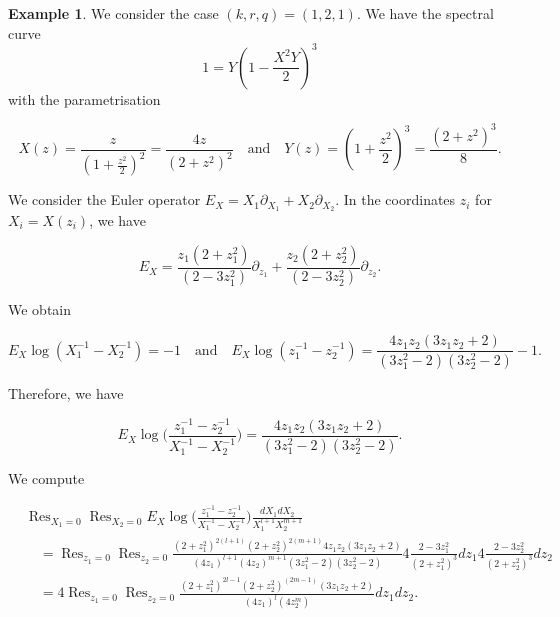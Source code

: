 \documentclass[10pt,a4paper,oneside,no-math,reqno]{amsart}%
\theoremstyle{plain}
\theoremstyle{definition}
\newtheorem{example}[theorem]{Example}
\theoremstyle{remark}
\numberwithin{equation}{section}
\newcommand{\1}{\mathds{1}}
\newcommand{\<}{\langle}
\renewcommand{\>}{\rangle}
\DeclareMathOperator*{\Res}{Res}
\begin{document}
\begin{example}
\label{ex-closedform}
We consider the case $(k,r,q)=(1,2,1)$. We have the spectral curve
\begin{equation}
    1
    =
    Y(1-\frac{X^2Y}{2})^3
\end{equation}
with the parametrisation

\begin{equation}
    X(z)
    =
    \frac{z}{(1+\frac{z^2}{2})^2}
    =
    \frac{4z}{(2+z^2)^2}
    \quad
    \textrm{and}
    \quad
    Y(z)
    =
    (1+\frac{z^2}{2})^3
    =
    \frac{(2+z^2)^3}{8}.
\end{equation}

We consider the Euler operator $ E_X = X_1 \partial_{X_1} + X_2 \partial_{X_2} $. In the coordinates $z_i$ for $X_i = X(z_i)$, we have

\begin{equation}
    E_X
    =
    \frac{z_1(2+z_1^2)}{(2-3z_1^2)} \partial_{z_1} + \frac{z_2(2+z_2^2)}{(2-3z_2^2)} \partial_{z_2}.
\end{equation}

We obtain

\begin{equation}
    E_X \log (X_1^{-1} - X_2^{-1})
    =
    -1
    \quad
    \textrm{and}
    \quad
    E_X \log (z_1^{-1} - z_2^{-1})
    =
    \frac{4z_1 z_2 (3z_1z_2 + 2)}{(3z_1^2 - 2) (3z_2^2 - 2)} - 1.
\end{equation}

Therefore, we have

\begin{equation}
    E_X \log \big( \frac{z_1^{-1} - z_2^{-1}}{X_1^{-1} - X_2^{-1}} \big)
    =
    \frac{4z_1 z_2 (3z_1 z_2 + 2)}{(3z_1^2 - 2) (3z_2^2 - 2)}.
\end{equation}

We compute

\begin{equation}
\begin{split}
    &\Res_{X_1=0} \Res_{X_2=0}  E_X  \log \big(\frac{z_1^{-1} - z_2^{-1}}{X_1^{-1} - X_2^{-1}} \big) \frac{dX_1 dX_2 }{X_1^{l+1} X_2^{m+1}}
    \\
    &\quad =
    \Res_{z_1=0} \Res_{z_2=0} \frac{(2 + z_1^2)^{2(l+1)} (2 + z_2^2)^{2(m+1)} 4 z_1 z_2 (3 z_1 z_2 + 2)}{(4z_1)^{l+1} (4z_2)^{m+1} (3z_1^2 - 2) (3z_2^2 - 2)}4 \frac{2 - 3z_1^2}{(2 + z_1^2)^3} dz_1 4 \frac{2 - 3z_2^2}{(2 + z_2^2)^3} dz_2
    \\
    &\quad =
    4 \Res_{z_1=0} \Res_{z_2=0} \frac{(2 + z_1^2)^{2l-1} (2 + z_2^2)^{(2m-1)}(3 z_1 z_2 + 2)}{(4 z_1)^l (4 z_2^m)} dz_1 dz_2.
\end{split}
\end{equation}


\end{example}
\end{document}

